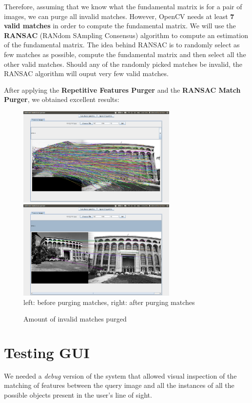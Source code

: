 \documentclass[a4paper,onecolumn,oneside,titlepage,11pt]{report}
\begin{document}
Therefore, assuming that we know what the fundamental matrix is for a pair of images, we can purge all invalid matches. However, OpenCV needs at least \textbf{7 valid matches} in order to compute the fundamental matrix. We will use the \textbf{RANSAC} (RANdom SAmpling Consensus) algorithm to compute an estimation of the fundamental matrix. The idea behind RANSAC is to randomly select as few matches as possible, compute the fundamental matrix and then select all the other valid matches. Should any of the randomly picked matches be invalid, the RANSAC algorithm will ouput very few valid matches.

\vspace{1cm}

After applying the \textbf{Repetitive Features Purger} and the \textbf{RANSAC Match Purger}, we obtained excellent results:

\begin{figure}[H]
\begin{center}
\includegraphics[width=7.9cm]{images/matches_before_purge.png}
\includegraphics[width=7.9cm]{images/matches_after_purge.png}\\
left: before purging matches, right: after purging matches
\caption{Amount of invalid matches purged}
\end{center}
\end{figure}

\section{Testing GUI}
We needed a \emph{debug} version of the system that allowed visual inspection of the matching of features between the query image and all the instances of all the possible objects present in the user's line of sight.
\end{document}
